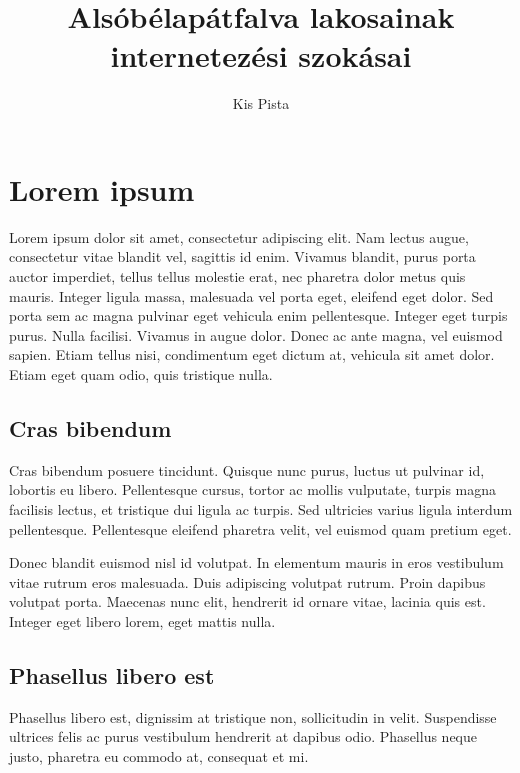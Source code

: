 \documentclass{elteikthesis}
\title{Alsóbélapátfalva lakosainak internetezési szokásai}
\author{Kis Pista}
\begin{document}
\frontmatter

	\maketitle
	\tableofcontents
	
\mainmatter

\chapter{Lorem ipsum} 
Lorem ipsum dolor sit amet, consectetur adipiscing elit. Nam lectus augue, 
consectetur vitae blandit vel, sagittis id enim. Vivamus blandit, purus porta 
auctor imperdiet, tellus tellus molestie erat, nec pharetra dolor metus quis 
mauris. Integer ligula massa, malesuada vel porta eget, eleifend eget dolor. 
Sed porta sem ac magna pulvinar eget vehicula enim pellentesque. Integer eget 
turpis purus. Nulla facilisi. Vivamus in augue dolor. Donec ac ante magna, 
vel euismod sapien. Etiam tellus nisi, condimentum eget dictum at, vehicula 
sit amet dolor. Etiam eget quam odio, quis tristique nulla.

\section{Cras bibendum} 
Cras bibendum posuere tincidunt. Quisque nunc purus, luctus ut pulvinar id, 
lobortis eu libero. Pellentesque cursus, tortor ac mollis vulputate, turpis 
magna facilisis lectus, et tristique dui ligula ac turpis. Sed ultricies 
varius ligula interdum pellentesque. Pellentesque eleifend pharetra velit, 
vel euismod quam pretium eget. 

Donec blandit euismod nisl id volutpat. In 
elementum mauris in eros vestibulum vitae rutrum eros malesuada. Duis 
adipiscing volutpat rutrum. Proin dapibus volutpat porta. Maecenas nunc elit, 
hendrerit id ornare vitae, lacinia quis est. Integer eget libero lorem, eget 
mattis nulla. 

\section{Phasellus libero est} 
Phasellus libero est, dignissim at tristique non, sollicitudin in velit. 
Suspendisse ultrices felis ac purus vestibulum hendrerit at dapibus odio. 
Phasellus neque justo, pharetra eu commodo at, consequat et mi. 
\end{document}
